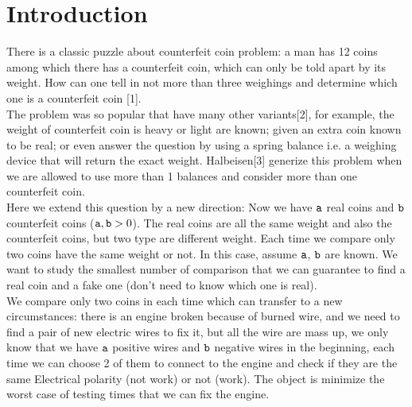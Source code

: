 \section{Introduction}

There is a classic puzzle about counterfeit coin problem: a man has 12 coins among which there has a counterfeit coin, which can only be told apart by its weight. How can one tell in not more than three weighings and determine which one is a counterfeit coin [1].  \\


The problem was so popular that have many other variants[2], for example, the weight of counterfeit coin is heavy or light are known; given an extra coin known to be real; or even answer the question by using a spring balance i.e. a weighing device that will return the exact weight. Halbeisen[3] generize this problem when we are allowed to use more than 1 balances and consider more than one counterfeit coin.  \\



Here we extend this question by a new direction: Now we have $\mathtt{a}$ real coins and $\mathtt{b}$ counterfeit coins ($ \mathtt{a}, \mathtt{b} > 0$). The real coins are all the same weight and also the counterfeit coins, but two  type are different weight. Each time we compare only two coins have the same weight or not. In this case, assume $\mathtt{a}$, $\mathtt{b}$ are known. We want to study the smallest number of comparison that we can guarantee to find a real coin and a fake one (don't need to know which one is real). \\

We compare only two coins in each time which can transfer to a new circumstances: 
there is an engine broken because of burned wire, and we need to find a pair of new electric wires to fix it, but all the wire are mass up, we only know that we have $\mathtt{a}$ positive wires and $\mathtt{b}$ negative wires in the beginning, each time we can choose 2 of them to connect to the engine and check if they are the same Electrical polarity (not work) or not (work). The object is minimize the worst case of testing times that we can fix the engine.  \\

